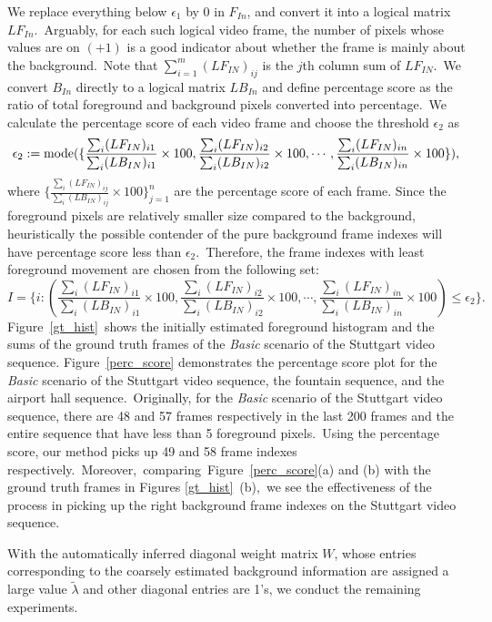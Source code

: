 \documentclass[twoside,11pt]{article}
\begin{document}
We replace everything below $\epsilon_1$ by 0 in $F_{In}$, and convert it into a logical matrix $LF_{In}$.~Arguably, for each such logical video frame, the number of pixels whose values are on $(+1)$ is a good indicator about whether the frame is mainly about the background.~Note that $\sum_{i=1}^m(LF_{IN})_{ij}$ is the $j$th column sum of $LF_{IN}$.~We convert $B_{In}$ directly to a logical matrix $LB_{In}$ and define percentage score as the ratio of total foreground and background pixels converted into percentage.~We calculate the percentage score of each video frame and choose the threshold $\epsilon_2$ as
$$ \epsilon_2:= {\rm mode}(\{\frac{\sum_i(LF_{IN})_{i1}}{\sum_i(LB_{IN})_{i1}}\times100,\frac{\sum_i(LF_{IN})_{i2}}{\sum_i(LB_{IN})_{i2}}\times100,\cdots, \frac{\sum_i(LF_{IN})_{in}}{\sum_i(LB_{IN})_{in}}\times100\}),
$$
where $\{\frac{\sum_i(LF_{IN})_{ij}}{\sum_i(LB_{IN})_{ij}}\times100\}_{j=1}^{n}$ are the percentage score of each frame. Since the foreground pixels are relatively smaller size compared to the background, heuristically the possible contender of the pure background frame indexes will have percentage score less than $\epsilon_2.$~Therefore, the frame indexes with least foreground movement are chosen from the following set:
$$
I = \{i:(\frac{\sum_i(LF_{IN})_{i1}}{\sum_i(LB_{IN})_{i1}}\times100,\frac{\sum_i(LF_{IN})_{i2}}{\sum_i(LB_{IN})_{i2}}\times100,\cdots, \frac{\sum_i(LF_{IN})_{in}}{\sum_i(LB_{IN})_{in}}\times100)\le \epsilon_2\}.
$$
Figure~\ref{gt_hist}~shows the initially estimated foreground histogram and the sums of the ground truth frames of the {\it Basic} scenario of the Stuttgart video sequence. 
Figure~\ref{perc_score} demonstrates the percentage score plot for the {\it Basic} scenario of the Stuttgart video sequence, the fountain sequence, and the airport hall sequence.~Originally, for the {\it Basic} scenario of the Stuttgart video sequence, there are 48 and 57 frames respectively in the last 200 frames and the entire sequence that have less than 5 foreground pixels.~Using the percentage score, our method picks up 49 and 58 frame indexes respectively.~Moreover,~comparing~Figure~\ref{perc_score}(a) and (b) with the ground truth frames in Figures \ref{gt_hist}~(b),~we see the effectiveness of the process in picking up the right background frame indexes on the Stuttgart video sequence.

With the automatically inferred diagonal weight matrix $W$, whose entries corresponding to the coarsely estimated background information are assigned a large value $\tilde{\lambda}$ and other diagonal entries are 1's, we conduct the remaining experiments. 
\end{document}
